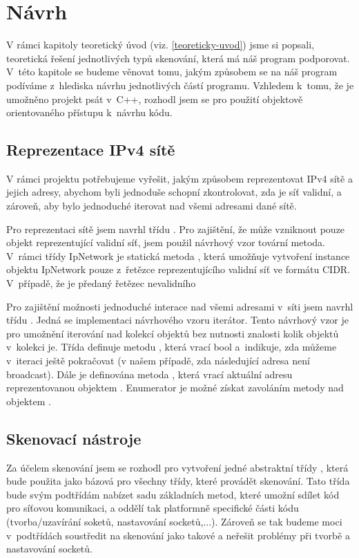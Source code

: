 \documentclass[../projekt.tex]{subfiles}
\begin{document}
\chapter{Návrh}
V rámci kapitoly teoretický úvod (viz. \ref{teoreticky-uvod}) jsme si popsali, teoretická řešení jednotlivých typů skenování, která má náš program podporovat. V~této kapitole se budeme věnovat tomu, jakým způsobem se na náš program podíváme z~hlediska návrhu jednotlivých částí programu. Vzhledem k~tomu, že je umožněno projekt psát v~C++, rozhodl jsem se pro použití objektově orientovaného přístupu k~návrhu kódu.

\section{Reprezentace IPv4 sítě}
V rámci projektu potřebujeme vyřešit, jakým způsobem reprezentovat IPv4 sítě a jejich adresy, abychom byli jednoduše schopní zkontrolovat, zda je síť validní, a zároveň, aby bylo jednoduché iterovat nad všemi adresami dané sítě.

Pro reprezentaci sítě jsem navrhl třídu . Pro zajištění, že může vzniknout pouze objekt reprezentující validní síť, jsem použil návrhový vzor tovární metoda\cite{DesignPatternFactoryMethod}. V~rámci třídy IpNetwork je statická metoda , která umožňuje vytvoření instance objektu IpNetwork pouze z~řetězce reprezentujícího validní síť ve formátu CIDR\cite{RFC4632}. V~případě, že je předaný řetězec nevalidního 

Pro zajištění možnosti jednoduché interace nad všemi adresami v~síti jsem navrhl třídu . Jedná se implementaci návrhového vzoru iterátor\cite{DesignPatternIterator}. Tento návrhový vzor je pro umožnění iterování nad kolekcí objektů bez nutnosti znalosti kolik objektů v~kolekci je. Třída  definuje metodu , která vrací bool a~indikuje, zda můžeme v~iteraci ještě pokračovat (v našem případě, zda následující adresa není broadcast). Dále je definována metoda , která vrací aktuální adresu reprezentovanou objektem . Enumerator je možné získat zavoláním metody  nad objektem .

\section{Skenovací nástroje}

Za účelem skenování jsem se rozhodl pro vytvoření jedné abstraktní třídy , která bude použita jako bázová pro všechny třídy, které provádět skenování. Tato třída bude svým podtřídám nabízet sadu základních metod, které umožní sdílet kód pro síťovou komunikaci, a oddělí tak platformně specifické části kódu (tvorba/uzavírání soketů, nastavování socketů,...). Zároveň se tak budeme moci v~podtřídách  soustředit na skenování jako takové a neřešit problémy při tvorbě a nastavování socketů.
\end{document}
